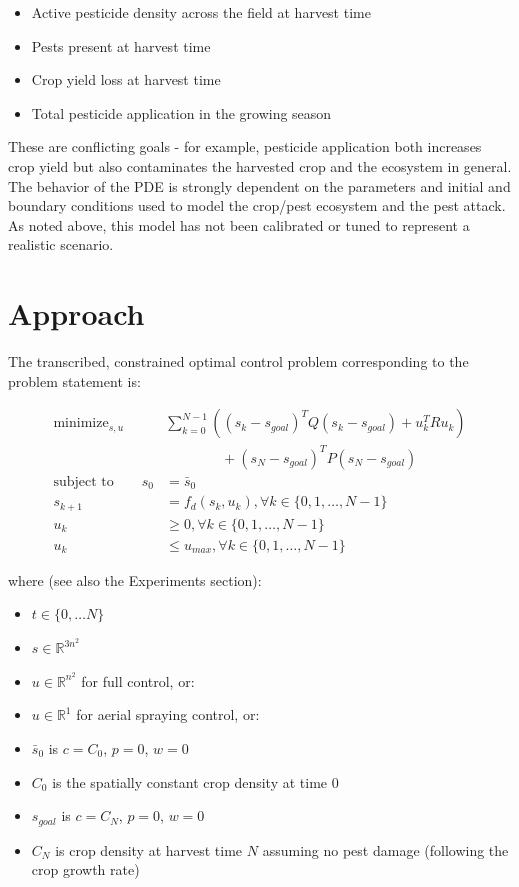 \documentclass[11pt]{article}
\DeclareMathOperator*{\minimize}{minimize}
\begin{document}
\begin{itemize}
\setlength\itemsep{-1pt}
\item Active pesticide density across the field at harvest time
\item Pests present at harvest time
\item Crop yield loss at harvest time
\item Total pesticide application in the growing season
\end{itemize}

These are conflicting goals - for example, pesticide application both increases crop yield but also contaminates the harvested crop and the ecosystem in general.
The behavior of the PDE is strongly dependent on the parameters and initial and boundary conditions used to model the crop/pest ecosystem and the pest attack. As noted above, this model has not been calibrated or tuned to represent a realistic scenario.

\section{Approach}

The transcribed, constrained optimal control problem corresponding to the problem statement is:

\begin{align}
\minimize_{s,u} & \sum_{k=0}^{N-1} \left( (s_k - s_{goal})^T Q (s_k - s_{goal}) + u_k^T R u_k \right) \\
	     & \qquad \qquad  + (s_N - s_{goal})^T P (s_N - s_{goal}) \nonumber  \\
\text{subject to} \qquad s_0 &= \bar{s}_0 \nonumber \\
s_{k+1} &= f_d(s_k, u_k), \forall k \in \{ 0,1,\dots , N-1 \} \nonumber \\
u_k &\geq 0, \forall k \in \{ 0,1,\dots, N-1\} \nonumber \\	   
u_k &\leq u_{max}, \forall k \in \{ 0,1,\dots, N-1 \} \nonumber	     
\end{align}
 
where (see also the Experiments section):

\begin{itemize}
\setlength\itemsep{-1pt}
\item $t \in \{0, \dots N\}$
\item $s \in \mathbb{R}^{3n^2}$
\item $u \in \mathbb{R}^{n^2}$ for full control, or:
\item $u \in \mathbb{R}^{1}$ for aerial spraying control, or:
\item $\bar{s}_0$ is $c = C_0$, $p = 0$, $w = 0$
\item $C_0$ is the spatially constant crop density at time $0$
\item $s_{goal}$ is $c = C_N$, $p = 0$, $w = 0$
\item $C_N$ is crop density at harvest time $N$ assuming no pest damage (following the crop growth rate)
\end{itemize}
\end{document}
